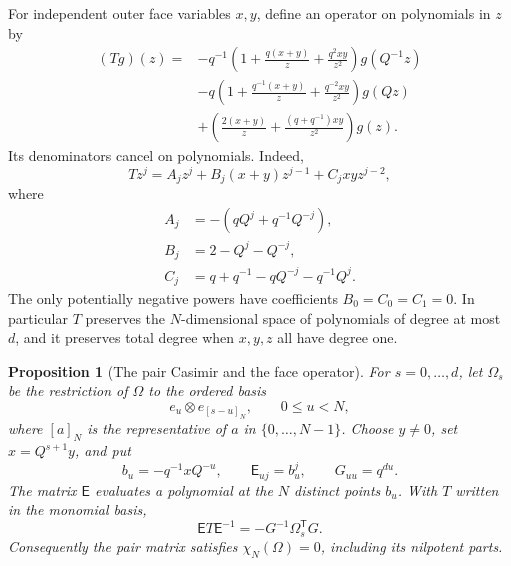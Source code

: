\documentclass[11pt]{article}
\numberwithin{equation}{section}
\newtheorem{proposition}[theorem]{Proposition}
\theoremstyle{definition}\newtheorem{definition}[theorem]{Definition}
\theoremstyle{remark}\newtheorem{remark}[theorem]{Remark}
\begin{document}
For independent outer face variables \(x,y\), define an operator on
polynomials in \(z\) by
\begin{equation}\label{uf:face-difference-operator}
\begin{split}
 (Tg)(z)={}&-q^{-1}
   \left(1+\frac{q(x+y)}z+\frac{q^2xy}{z^2}\right)g(Q^{-1}z)\\
 &-q\left(1+\frac{q^{-1}(x+y)}z
                     +\frac{q^{-2}xy}{z^2}\right)g(Qz)\\
 &+\left(\frac{2(x+y)}z
                 +\frac{(q+q^{-1})xy}{z^2}\right)g(z).
\end{split}
\end{equation}
Its denominators cancel on polynomials. Indeed,
\[
 Tz^j=A_jz^j+B_j(x+y)z^{j-1}+C_jxyz^{j-2},
\]
where
\[
 \begin{split}
 A_j&=-(qQ^j+q^{-1}Q^{-j}),\\
 B_j&=2-Q^j-Q^{-j},\\
 C_j&=q+q^{-1}-qQ^{-j}-q^{-1}Q^j.
 \end{split}
\]
The only potentially negative powers have coefficients
\(B_0=C_0=C_1=0\). In particular \(T\) preserves the
\(N\)-dimensional space of polynomials of degree at most \(d\),
and it preserves total degree when \(x,y,z\) all have degree one.

\begin{proposition}[The pair Casimir and the face operator]
\label{prop:local-face-fourier}
For \(s=0,\ldots,d\), let \(\Omega_s\) be the restriction of
\(\Omega\) to the ordered basis
\[
 e_u\otimes e_{[s-u]_N},\qquad 0\le u<N,
\]
where \([a]_N\) is the representative of \(a\) in
\(\{0,\ldots,N-1\}\). Choose \(y\ne0\), set
\(x=Q^{s+1}y\), and put
\[
 b_u=-q^{-1}xQ^{-u},\qquad
 \mathsf E_{uj}=b_u^j,\qquad
 G_{uu}=q^{du}.
\]
The matrix \(\mathsf E\) evaluates a polynomial at the \(N\)
distinct points \(b_u\). With \(T\) written in the monomial basis,
\begin{equation}\label{uf:face-fourier-conjugacy}
 \mathsf E T\mathsf E^{-1}=-G^{-1}\Omega_s^{\mathsf T}G.
\end{equation}
Consequently the pair matrix satisfies
\(\chi_N(\Omega)=0\), including its nilpotent parts.
\end{proposition}
\end{document}
